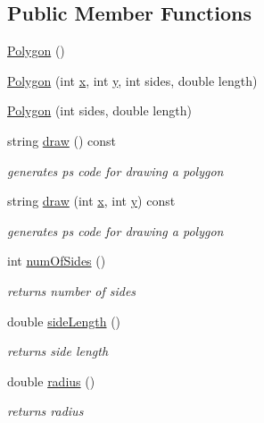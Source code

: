 \subsection*{Public Member Functions}
\begin{DoxyCompactItemize}
\item 
\hyperlink{class_polygon_ac183e712f8be1e13f1c9d5b4d4512ead}{Polygon} ()
\item 
\hyperlink{class_polygon_a295d10cfffd80d67f603642d82f62279}{Polygon} (int \hyperlink{class_shape_a41e403e73d2949f1a6adfba6032c41ec}{x}, int \hyperlink{class_shape_ac757f715cc5b5681f2c691663ac06f0a}{y}, int sides, double length)
\item 
\hyperlink{class_polygon_a8cb36a982609ea22b8722b76cfa9d6fa}{Polygon} (int sides, double length)
\item 
string \hyperlink{class_polygon_a732b40203a5cc2baadd90446c3ec8213}{draw} () const 
\begin{DoxyCompactList}\small\item\em generates ps code for drawing a polygon \end{DoxyCompactList}\item 
string \hyperlink{class_polygon_af0f4e693010935528bb3e99bca2cc433}{draw} (int \hyperlink{class_shape_a41e403e73d2949f1a6adfba6032c41ec}{x}, int \hyperlink{class_shape_ac757f715cc5b5681f2c691663ac06f0a}{y}) const 
\begin{DoxyCompactList}\small\item\em generates ps code for drawing a polygon \end{DoxyCompactList}\item 
int \hyperlink{class_polygon_a3c57ca9893bf151501123b8b1787acf6}{num\+Of\+Sides} ()
\begin{DoxyCompactList}\small\item\em returns number of sides \end{DoxyCompactList}\item 
double \hyperlink{class_polygon_ab03b3c38a9f26b2c0d46294dd77f4318}{side\+Length} ()
\begin{DoxyCompactList}\small\item\em returns side length \end{DoxyCompactList}\item 
double \hyperlink{class_polygon_af1af4ce31b24eb31b4300e932f2578c2}{radius} ()
\begin{DoxyCompactList}\small\item\em returns radius \end{DoxyCompactList}\end{DoxyCompactItemize}
